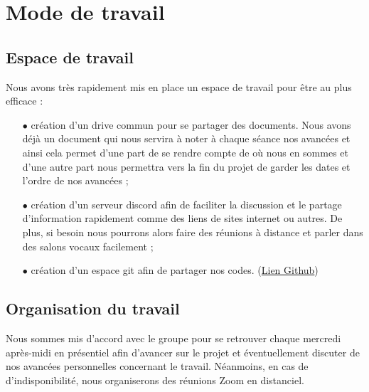 \newpage
\section{Mode de travail}

\vspace{0.6cm}

\subsection{Espace de travail}
Nous avons très rapidement mis en place un espace de travail pour être au plus efficace :

\begin{itemize}
  \item[$\bullet$]création d'un drive commun pour se partager des documents. Nous avons déjà un document qui nous servira à noter à chaque séance nos avancées et ainsi cela permet d'une part de se rendre compte de où nous en sommes et d'une autre part nous permettra vers la fin du projet de garder les dates et l'ordre de nos avancées ;
  \item[$\bullet$] création d'un serveur discord afin de faciliter la discussion et le partage d'information rapidement comme des liens de sites internet ou autres. De plus, si besoin nous pourrons alors faire des réunions à distance et parler dans des salons vocaux facilement ; 
  \item[$\bullet$] création d'un espace git afin de partager nos codes. 
  (\href{https://github.com/viitality/Homer-vs-Donuts}{Lien Github})
  
\end{itemize}

\vspace{0.6cm}

\subsection{Organisation du travail}

Nous sommes mis d'accord avec le groupe pour se retrouver chaque mercredi après-midi en présentiel afin d'avancer sur le projet et éventuellement discuter de nos avancées personnelles concernant le travail. Néanmoins, en cas de d'indisponibilité, nous organiserons des réunions Zoom en distanciel.
\\

